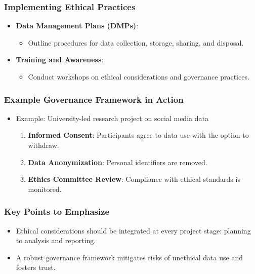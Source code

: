 \documentclass[aspectratio=169]{beamer}
\begin{document}
\begin{frame}[fragile]
    \frametitle{Implementing Ethical Practices}
    \begin{itemize}
        \item \textbf{Data Management Plans (DMPs)}: 
        \begin{itemize}
            \item Outline procedures for data collection, storage, sharing, and disposal.
        \end{itemize}
        \item \textbf{Training and Awareness}:
        \begin{itemize}
            \item Conduct workshops on ethical considerations and governance practices.
        \end{itemize}
    \end{itemize}
\end{frame}

\begin{frame}[fragile]
    \frametitle{Example Governance Framework in Action}
    \begin{itemize}
        \item Example: University-led research project on social media data
        \begin{enumerate}
            \item \textbf{Informed Consent}: Participants agree to data use with the option to withdraw.
            \item \textbf{Data Anonymization}: Personal identifiers are removed.
            \item \textbf{Ethics Committee Review}: Compliance with ethical standards is monitored.
        \end{enumerate}
    \end{itemize}
\end{frame}

\begin{frame}[fragile]
    \frametitle{Key Points to Emphasize}
    \begin{itemize}
        \item Ethical considerations should be integrated at every project stage: planning to analysis and reporting.
        \item A robust governance framework mitigates risks of unethical data use and fosters trust.
    \end{itemize}
\end{frame}
\end{document}
